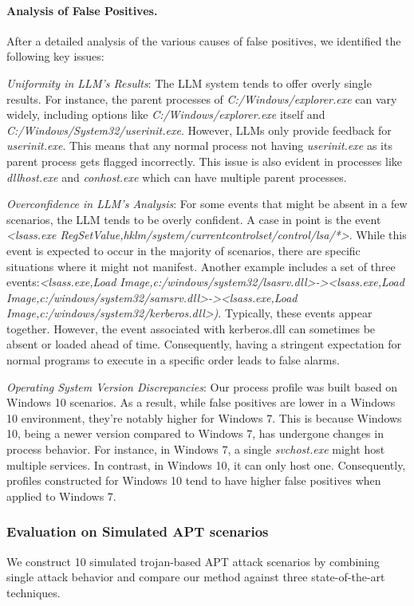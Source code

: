 \smallskip
\paragraph{Analysis of False Positives.}
After a detailed analysis of the various causes of false positives, we identified the following key issues:

\textit{Uniformity in LLM's Results}: The LLM system tends to offer overly single results. For instance, the parent processes of \textit{C:/Windows/explorer.exe} can vary widely, including options like \textit{C:/Windows/explorer.exe} itself and \textit{C:/Windows/System32/userinit.exe}. However, LLMs only provide feedback for \textit{userinit.exe}. This means that any normal process not having \textit{userinit.exe} as its parent process gets flagged incorrectly. This issue is also evident in processes like \textit{dllhost.exe} and \textit{conhost.exe} which can have multiple parent processes.

\textit{Overconfidence in LLM's Analysis}: For some events that might be absent in a few scenarios, the LLM tends to be overly confident. A case in point is the event \textit{<lsass.exe RegSetValue,hklm/system/currentcontrolset/control/lsa/*>}. While this event is expected to occur in the majority of scenarios, there are specific situations where it might not manifest.  Another example includes a set of three events:\textit{<lsass.exe,Load Image,c:/windows/system32/lsasrv.dll>-><lsass.exe,Load Image,c:/windows/system32/samsrv.dll>-><lsass.exe,Load Image,c:/windows/system32/kerberos.dll>)}. Typically, these events appear together. However, the event associated with kerberos.dll can sometimes be absent or loaded ahead of time. Consequently, having a stringent expectation for normal programs to execute in a specific order leads to false alarms.

\textit{Operating System Version Discrepancies}: Our process profile was built based on Windows 10 scenarios. As a result, while false positives are lower in a Windows 10 environment, they're notably higher for Windows 7. This is because Windows 10, being a newer version compared to Windows 7, has undergone changes in process behavior. For instance, in Windows 7, a single \textit{svchost.exe} might host multiple services. In contrast, in Windows 10, it can only host one. Consequently, profiles constructed for Windows 10 tend to have higher false positives when applied to Windows 7.



\subsubsection{Evaluation on Simulated APT scenarios}
We construct 10 simulated trojan-based APT attack scenarios by combining single attack behavior and compare our method against three state-of-the-art techniques. 

